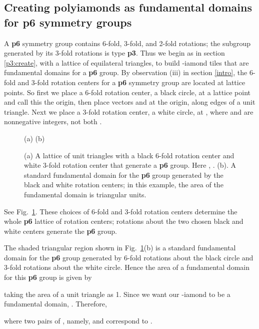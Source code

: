 \documentclass{ws-ijcga}
\begin{document}
\subsection{Creating polyiamonds as fundamental domains for {\bf p6} symmetry groups}
\label{p6:create}
A {\bf p6} symmetry group contains 6-fold, 3-fold, and 2-fold rotations; 
the subgroup generated by its 3-fold rotations is type {\bf p3}. 
Thus we begin as in section \ref{p3:create}, with a lattice of equilateral triangles,
to build -iamond tiles that are fundamental domains for a {\bf p6} group. 
By observation (iii) in section \ref{intro}, 
the 6-fold and 3-fold rotation centers for a {\bf p6} symmetry group are located at lattice points. 
So first we place a 6-fold rotation center, a black circle, at a lattice point and call this the origin, then
place vectors  and  at the origin, along edges of a unit triangle. 
Next we place a 3-fold rotation center, 
a white circle, at , 
where  and  are nonnegative integers, 
not both . 
\begin{figure}[h]
\centerline{
\hspace{1em}
}
\centerline{(a) \hspace{3cm} (b)}
\vspace*{8pt}
\caption{
(a) A lattice of unit triangles with a black 6-fold rotation center and white 3-fold rotation center that
generate a {\bf p6} group. 
Here , . (b). A standard fundamental domain for the {\bf p6} group generated by the
black and white rotation centers; 
in this example, the area of the fundamental domain is  triangular units.
\label{p6lattice}
}
\end{figure}
See Fig.~\ref{p6lattice}. 
These choices of 6-fold and 3-fold rotation centers determine the whole {\bf p6} lattice of rotation
centers; 
rotations about the two chosen black and white centers generate the {\bf p6} group.

The shaded triangular region shown in Fig.~\ref{p6lattice}(b) is a standard fundamental domain for the {\bf p6}
group generated by 6-fold rotations about the black circle and 3-fold rotations about the white circle. 
Hence the area of a fundamental domain for this {\bf p6} group is given by

taking the area of a unit triangle as 1. 
Since we want our -iamond to be a fundamental
domain, . Therefore,
  
where two pairs of , namely,  and  correspond to .
\end{document}
